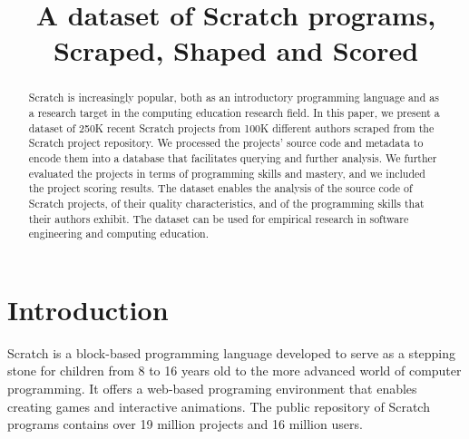 \documentclass[10pt, conference]{IEEEtran}
\begin{document}
\title{A dataset of Scratch programs,\\Scraped, Shaped and Scored}


\author{
	
}

\maketitle


\begin{abstract}
Scratch is increasingly popular, both as an introductory programming language and as a research target in the computing education research field.	
In this paper, we present a dataset of 250K recent Scratch projects from 100K different authors scraped from the Scratch project repository.
We processed the projects' source code and metadata to encode them into a database that facilitates querying and further analysis. We further evaluated the projects in terms of programming skills and mastery, and we included the project scoring results.
The dataset enables the analysis of the source code of Scratch projects, of their quality characteristics, and of the programming skills that their authors exhibit.
The dataset can be used for empirical research in software engineering and computing education.
\end{abstract}
 
\section{Introduction}
Scratch \cite{resnick_scratch:_2009} is a block-based programming language developed to serve as a stepping stone for children from 8 to 16 years old to the more advanced world of computer programming.
It offers a web-based programing environment that enables creating games and interactive animations. The public repository of Scratch programs contains over 19 million projects and 16 million users.
\end{document}
